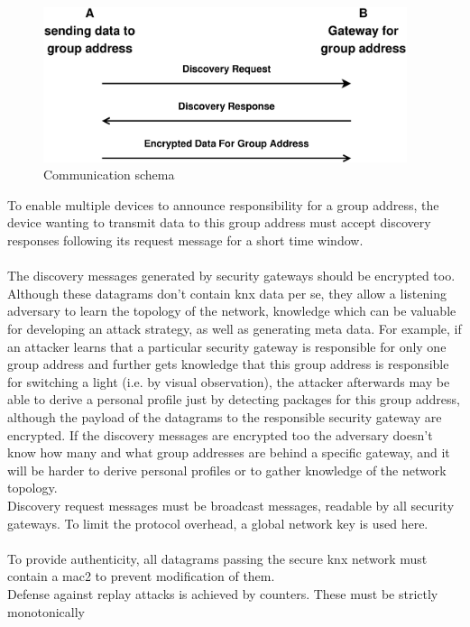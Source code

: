 \begin{figure}
  \centering
    \includegraphics[width=0.95\textwidth]{figures/protokoll1.eps}
 \caption{Communication schema}
 \label{fig:prot1}
\end{figure}
To enable multiple devices to announce responsibility for a group address, the device wanting to transmit data to this group address must accept discovery responses
following its request message for a short time window.
\\
\\
The discovery messages generated by security gateways should be encrypted too. Although these datagrams don't contain \gls{knx} data per se, they allow
a listening adversary to learn the topology of the network, knowledge which can be valuable for developing an attack strategy, as well as generating meta data.
For example, if an attacker learns that a particular security gateway is responsible for only one group address and further gets knowledge that this 
group address is responsible for switching a light (i.e. by visual observation), the attacker afterwards may be able to derive a personal profile just by detecting
packages for this group address, although the payload of the datagrams to the responsible security gateway are encrypted.
If the discovery messages are encrypted too the adversary doesn't know how many and what
group addresses are behind a specific gateway, and it will be harder to derive personal profiles or to gather knowledge of the network topology.
\\
Discovery request messages must be broadcast messages, readable by all security gateways. To limit the protocol overhead, a global network key is used here.
\\
\\
To provide authenticity, all datagrams passing the secure \gls{knx} network must contain a \gls{mac2} to prevent modification of them.
\\
Defense against replay attacks is achieved by counters. These must be strictly monotonically
